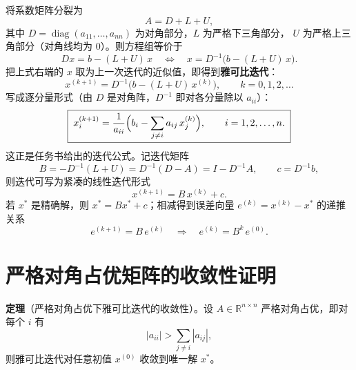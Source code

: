 \documentclass[12pt,a4paper]{ctexart}
\begin{document}
将系数矩阵分裂为
\begin{equation}
  A = D + L + U,
\end{equation}
其中 $D=\operatorname{diag}(a_{11},\dots,a_{nn})$ 为对角部分，$L$ 为严格下三角部分，
$U$ 为严格上三角部分（对角线均为 $0$）。则方程组等价于
\begin{equation}
  D x = b - (L+U)\,x
  \quad\Longleftrightarrow\quad
  x = D^{-1}\bigl(b - (L+U)\,x\bigr).
\end{equation}
把上式右端的 $x$ 取为上一次迭代的近似值，即得到\textbf{雅可比迭代}：
\begin{equation}
  x^{(k+1)} = D^{-1}\bigl(b - (L+U)\,x^{(k)}\bigr),\qquad k=0,1,2,\dots
\end{equation}
写成逐分量形式（由 $D$ 是对角阵，$D^{-1}$ 即对各分量除以 $a_{ii}$）：
\begin{equation}
  \boxed{\;
  x_i^{(k+1)} = \frac{1}{a_{ii}}\Bigl( b_i - \sum_{j\neq i} a_{ij}\, x_j^{(k)} \Bigr),
  \qquad i = 1,2,\dots,n.
  \;}
\end{equation}
这正是任务书给出的迭代公式。记迭代矩阵
\begin{equation}
  B = -D^{-1}(L+U) = D^{-1}(D - A) = I - D^{-1}A,
  \qquad
  c = D^{-1}b,
\end{equation}
则迭代可写为紧凑的线性迭代形式
\begin{equation}
  x^{(k+1)} = B\, x^{(k)} + c.
\end{equation}
若 $x^{\ast}$ 是精确解，则 $x^{\ast} = B x^{\ast} + c$；相减得到误差向量
$e^{(k)} = x^{(k)} - x^{\ast}$ 的递推关系
\begin{equation}
  e^{(k+1)} = B\, e^{(k)}
  \quad\Longrightarrow\quad
  e^{(k)} = B^{k}\, e^{(0)}.
\end{equation}

\section{严格对角占优矩阵的收敛性证明}

\textbf{定理}（严格对角占优下雅可比迭代的收敛性）。设 $A\in\mathbb R^{n\times n}$
严格对角占优，即对每个 $i$ 有
\begin{equation}
  |a_{ii}| > \sum_{j\neq i} |a_{ij}|,
\end{equation}
则雅可比迭代对任意初值 $x^{(0)}$ 收敛到唯一解 $x^{\ast}$。
\end{document}
